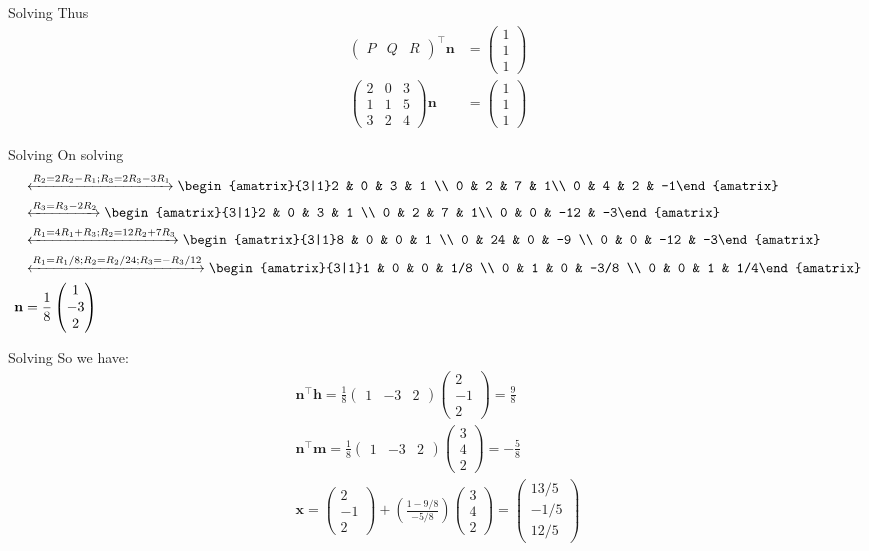 \documentclass{beamer}
\providecommand{\brak}[1]{\ensuremath{\left(#1\right)}}
\theoremstyle{remark}
\newcommand{\myvec}[1]{\ensuremath{\begin{pmatrix}#1\end{pmatrix}}}
\newcommand{\augvec}[3]{\ensuremath{\begin{amatrix}{#1|#2}#3\end{amatrix}}}
\let\vec\mathbf
\numberwithin{equation}{section}
\begin{document}
\begin{frame}{Solving}
Thus
\begin{align}
 \myvec{P & Q & R}^\top\vec{n} &= \myvec{1\\1\\1} \\
  \myvec{2 & 0 & 3 \\ 1 & 1 & 5 \\ 3 & 2 & 4}\vec{n} &= \myvec{1\\1\\1}
\end{align}
\end{frame}
\begin{frame}{Solving}
On solving
\begin{align}
&\xleftrightarrow[]{R_2 = 2R_2-R_1; R_3 = 2R_3-3R_1} \augvec{3}{1}{2 & 0 & 3 & 1 \\ 0 & 2 & 7 & 1\\ 0 & 4 & 2 & -1} \\ &\xleftrightarrow[]{R_3=R_3-2R_2}
  \augvec{3}{1}{2 & 0 & 3 & 1 \\ 0 & 2 & 7 & 1\\ 0 & 0 & -12 & -3} \\ &\xleftrightarrow[]{R_1=4R_1+R_3; R_2= 12R_2+7R_3}
  \augvec{3}{1}{8 & 0 & 0 & 1 \\ 0 & 24 & 0 & -9 \\ 0 & 0 & -12 & -3} \\ &\xleftrightarrow[]{R_1 = R_1/8; R_2 = R_2/24; R_3 = -R_3/12}
  \augvec{3}{1}{1 & 0 & 0 & 1/8 \\ 0 & 1 & 0 & -3/8 \\ 0 & 0 & 1 & 1/4} \\
  \vec{n} &= \frac{1}{8}\myvec{1\\-3\\2}
\end{align}
\end{frame}
\begin{frame}{Solving}
 So we have:
\begin{align}
\vec{n}^\top\vec{h}= \frac{1}{8}\myvec{1&-3&2}\myvec{2\\-1\\2} = \frac{9}{8}\\
\vec{n}^\top\vec{m} = \frac{1}{8}\myvec{1&-3&2}\myvec{3\\4\\2} = -\frac{5}{8} \\
\vec{x} = \myvec{2\\-1\\2} + \brak{\frac{1-9/8}{-5/8}}
\myvec{3\\4\\2} = \myvec{13/5\\-1/5\\12/5 }
\end{align}
\end{frame}
\end{document}
